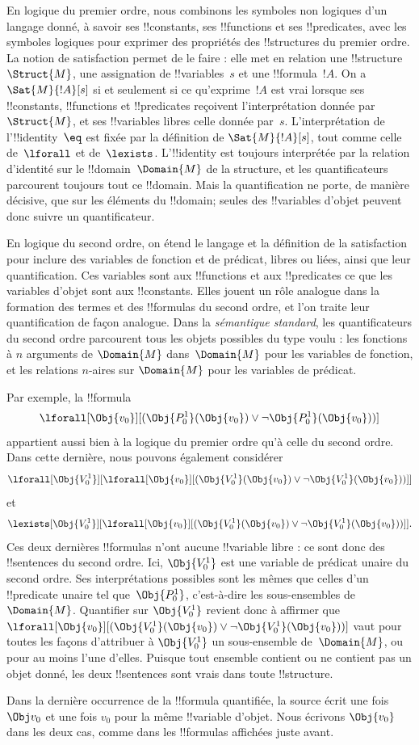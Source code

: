 \documentclass[../../../include/open-logic-section]{subfiles}
\begin{document}


En logique du premier ordre, nous combinons les
symboles non logiques d'un langage donné, à savoir
ses !!{constant}s, ses !!{function}s et ses
!!{predicate}s, avec les symboles logiques pour
exprimer des propriétés des !!{structure}s du
premier ordre. La notion de satisfaction permet de
le faire : elle met en relation une
!!{structure}~$\Struct{M}$, une assignation de
!!{variable}s~$s$ et une !!{formula}~$!A$.
On a $\Sat{M}{!A}[s]$ si et seulement si ce
qu'exprime~$!A$ est vrai lorsque ses
!!{constant}s, !!{function}s et !!{predicate}s
reçoivent l'interprétation donnée par~$\Struct{M}$,
et ses !!{variable}s libres celle donnée par~$s$.
L'interprétation de l'!!{identity}~$\eq$ est
fixée par la définition de $\Sat{M}{!A}[s]$,
tout comme celle de~$\lforall$ et de~$\lexists$.
L'!!{identity} est toujours interprétée par la
relation d'identité sur le !!{domain}~$\Domain{M}$
de la structure, et les quantificateurs parcourent
toujours tout ce !!{domain}. Mais la quantification
ne porte, de manière décisive, que sur les éléments
du !!{domain}; seules des !!{variable}s d'objet
peuvent donc suivre un quantificateur.

En logique du second ordre, on étend le langage
et la définition de la satisfaction pour inclure
des variables de fonction et de prédicat, libres
ou liées, ainsi que leur quantification. Ces
variables sont aux !!{function}s et aux
!!{predicate}s ce que les variables d'objet sont
aux !!{constant}s. Elles jouent un rôle analogue
dans la formation des termes et des !!{formula}s
du second ordre, et l'on traite leur quantification
de façon analogue. Dans la \emph{sémantique
standard}, les quantificateurs du second ordre
parcourent tous les objets possibles du type voulu :
les fonctions à $n$ arguments de $\Domain{M}$
dans~$\Domain{M}$ pour les variables de fonction,
et les relations $n$-aires sur $\Domain{M}$ pour
les variables de prédicat.

Par exemple, la !!{formula}
\[
\lforall[\Obj{v_0}][(\Obj{P^1_0}(\Obj{v_0})
\lor\lnot\Obj{P^1_0}(\Obj{v_0}))]
\]
appartient aussi bien à la logique du premier
ordre qu'à celle du second ordre. Dans cette
dernière, nous pouvons également considérer
\[
\lforall[\Obj{V^1_0}][\lforall[\Obj{v_0}]
[(\Obj{V^1_0}(\Obj{v_0})\lor
\lnot\Obj{V^1_0}(\Obj{v_0}))]]
\]
et
\[
\lexists[\Obj{V^1_0}][\lforall[\Obj{v_0}]
[(\Obj{V^1_0}(\Obj{v_0})\lor
\lnot\Obj{V^1_0}(\Obj{v_0}))]].
\]
Ces deux dernières !!{formula}s n'ont aucune
!!{variable} libre : ce sont donc des
!!{sentence}s du second ordre. Ici,
$\Obj{V^1_0}$ est une variable de prédicat
unaire du second ordre. Ses interprétations
possibles sont les mêmes que celles d'un
!!{predicate} unaire tel que~$\Obj{P^1_0}$,
c'est-à-dire les sous-ensembles de~$\Domain{M}$.
Quantifier sur $\Obj{V^1_0}$ revient donc à
affirmer que
$\lforall[\Obj{v_0}]
[(\Obj{V^1_0}(\Obj{v_0})\lor
\lnot\Obj{V^1_0}(\Obj{v_0}))]$
vaut pour toutes les façons d'attribuer à
$\Obj{V^1_0}$ un sous-ensemble de~$\Domain{M}$,
ou pour au moins l'une d'elles. Puisque tout
ensemble contient ou ne contient pas un objet
donné, les deux !!{sentence}s sont vrais dans
toute !!{structure}.

\begin{editorial}
Dans la dernière occurrence de la !!{formula}
quantifiée, la source écrit une fois
$\Obj v_0$ et une fois $v_0$ pour la même
!!{variable} d'objet. Nous écrivons
$\Obj{v_0}$ dans les deux cas, comme dans les
!!{formula}s affichées juste avant.
\end{editorial}
\end{document}
